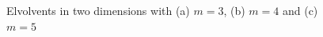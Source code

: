 \documentclass[smallcondensed]{svjour3}     %
\begin{document}
\begin{figure}
\begin{minipage}{0.32\linewidth}
\end{minipage}
\begin{minipage}{0.32\linewidth}
\end{minipage}
\caption{Elvolvents in two dimensions with (a) $m=3$, (b) $m=4$ and (c) $m=5$}
\label{fig:0}
\end{figure}
\end{document}
